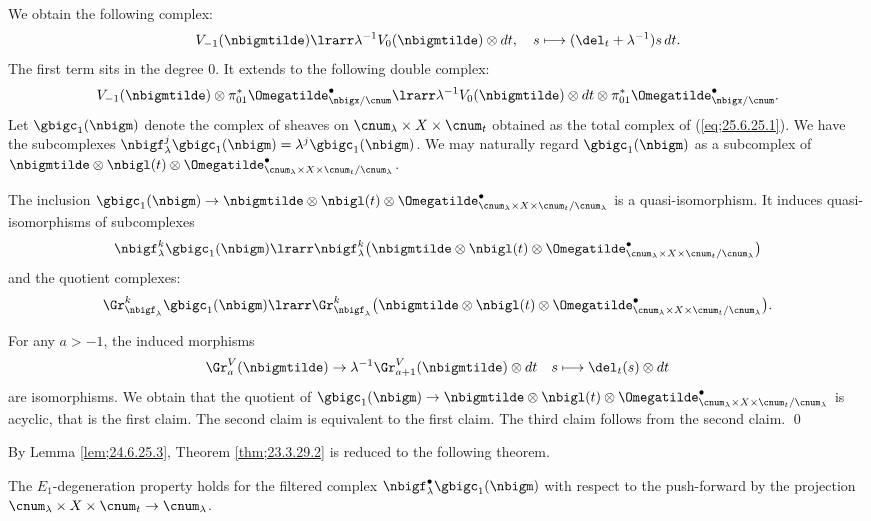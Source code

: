 \documentclass[a4,10pt]{article}
\begin{document}
We obtain the following complex:
\[
 V_{-1}(\nbigmtilde)
 \lrarr
 \lambda^{-1}V_0(\nbigmtilde)\otimes dt,
 \quad
 s\longmapsto (\del_t+\lambda^{-1})s\,dt.
\]
The first term sits in the degree $0$.
It extends to the following double complex:
\begin{equation}
\label{eq;25.6.25.1}
  V_{-1}(\nbigmtilde)
  \otimes
  \pi_{01}^{\ast}\Omegatilde^{\bullet}_{\nbigx/\cnum}
 \lrarr
 \lambda^{-1}V_0(\nbigmtilde)\otimes dt
 \otimes
 \pi_{01}^{\ast}\Omegatilde^{\bullet}_{\nbigx/\cnum}.
\end{equation}
Let $\gbigc_1(\nbigm)$ denote the complex of sheaves
on $\cnum_{\lambda}\times X\times\cnum_t$
obtained as the total complex of (\ref{eq;25.6.25.1}).
We have the subcomplexes
$\nbigf^j_{\lambda}\gbigc_1(\nbigm)
=\lambda^j\gbigc_1(\nbigm)$.
We may naturally regard
$\gbigc_1(\nbigm)$
as a subcomplex of 
$\nbigmtilde\otimes\nbigl(t)\otimes
\Omegatilde^{\bullet}
_{\cnum_{\lambda}\times X\times\cnum_t/\cnum_{\lambda}}$.

\begin{lem}
\label{lem;24.6.25.3}
The inclusion
$\gbigc_1(\nbigm)\to
\nbigmtilde\otimes\nbigl(t)\otimes
\Omegatilde^{\bullet}
_{\cnum_{\lambda}\times X\times\cnum_t/\cnum_{\lambda}}$
is a quasi-isomorphism.
It induces quasi-isomorphisms
of subcomplexes
\[
 \nbigf_{\lambda}^k
 \gbigc_1(\nbigm)\lrarr
 \nbigf_{\lambda}^k\bigl(
\nbigmtilde\otimes\nbigl(t)\otimes
\Omegatilde^{\bullet}
 _{\cnum_{\lambda}\times X\times\cnum_t/\cnum_{\lambda}}
 \bigr)
\] 
and the quotient complexes:
\[
 \Gr^k_{\nbigf_{\lambda}}
 \gbigc_1(\nbigm)\lrarr
 \Gr^k_{\nbigf_{\lambda}}\bigl(
\nbigmtilde\otimes\nbigl(t)\otimes
\Omegatilde^{\bullet}
 _{\cnum_{\lambda}\times X\times\cnum_t/\cnum_{\lambda}}
 \bigr).
\]
\end{lem}
\pf
For any $a>-1$,
the induced morphisms
\[
 \Gr^V_{a}(\nbigmtilde)
 \to
 \lambda^{-1}
 \Gr^V_{a+1}(\nbigmtilde)\otimes dt
 \quad
 s\longmapsto \del_t(s)\otimes dt
\]
are isomorphisms.
We obtain that the quotient of
$\gbigc_1(\nbigm)\to
\nbigmtilde\otimes\nbigl(t)\otimes
\Omegatilde^{\bullet}
_{\cnum_{\lambda}\times X\times\cnum_t/\cnum_{\lambda}}$
is acyclic,
that is the first claim.
The second claim is equivalent to the first claim.
The third claim follows from the second claim.
\hfill\qed

\vspace{.1in}

By Lemma \ref{lem;24.6.25.3},
Theorem \ref{thm;23.3.29.2} is reduced to the following theorem.
\begin{thm}
\label{thm;23.3.29.3}
 The $E_1$-degeneration property holds for
the filtered complex
 $\nbigf_{\lambda}^{\bullet}
 \gbigc_1(\nbigm)$
with respect to the push-forward
by the projection
$\cnum_{\lambda}\times X\times\cnum_t
\to \cnum_{\lambda}$.
\end{thm}
\end{document}
